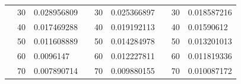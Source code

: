 \begin{table}[h]
\begin{tabular}{|cclcclccl|}
\multicolumn{1}{|c|}{\cellcolor[HTML]{FFFFC7}}                                & \multicolumn{1}{c|}{\cellcolor[HTML]{DAE8FC}30}        & \multicolumn{1}{l|}{\cellcolor[HTML]{DAE8FC}0.028956809} & \multicolumn{1}{c|}{\cellcolor[HTML]{FFFFC7}}                                & \multicolumn{1}{c|}{\cellcolor[HTML]{DAE8FC}30}        & \multicolumn{1}{l|}{\cellcolor[HTML]{DAE8FC}0.025366897} & \multicolumn{1}{c|}{\cellcolor[HTML]{FFFFC7}}                                & \multicolumn{1}{c|}{\cellcolor[HTML]{DAE8FC}30}        & 0.018587216 \\ \cline{2-3} \cline{5-6} \cline{8-9} 
\rowcolor[HTML]{DDFDFF} 
\multicolumn{1}{|c|}{\cellcolor[HTML]{FFFFC7}}                                & \multicolumn{1}{c|}{\cellcolor[HTML]{DDFDFF}40}        & \multicolumn{1}{l|}{\cellcolor[HTML]{DDFDFF}0.017469288} & \multicolumn{1}{c|}{\cellcolor[HTML]{FFFFC7}}                                & \multicolumn{1}{c|}{\cellcolor[HTML]{DDFDFF}40}        & \multicolumn{1}{l|}{\cellcolor[HTML]{DDFDFF}0.019192113} & \multicolumn{1}{c|}{\cellcolor[HTML]{FFFFC7}}                                & \multicolumn{1}{c|}{\cellcolor[HTML]{DDFDFF}40}        & 0.01590612  \\ \cline{2-3} \cline{5-6} \cline{8-9} 
\rowcolor[HTML]{DAE8FC} 
\multicolumn{1}{|c|}{\cellcolor[HTML]{FFFFC7}}                                & \multicolumn{1}{c|}{\cellcolor[HTML]{DAE8FC}50}        & \multicolumn{1}{l|}{\cellcolor[HTML]{DAE8FC}0.011608889} & \multicolumn{1}{c|}{\cellcolor[HTML]{FFFFC7}}                                & \multicolumn{1}{c|}{\cellcolor[HTML]{DAE8FC}50}        & \multicolumn{1}{l|}{\cellcolor[HTML]{DAE8FC}0.014284978} & \multicolumn{1}{c|}{\cellcolor[HTML]{FFFFC7}}                                & \multicolumn{1}{c|}{\cellcolor[HTML]{DAE8FC}50}        & 0.013201013 \\ \cline{2-3} \cline{5-6} \cline{8-9} 
\rowcolor[HTML]{DDFDFF} 
\multicolumn{1}{|c|}{\cellcolor[HTML]{FFFFC7}}                                & \multicolumn{1}{c|}{\cellcolor[HTML]{DDFDFF}60}        & \multicolumn{1}{l|}{\cellcolor[HTML]{DDFDFF}0.0096147}   & \multicolumn{1}{c|}{\cellcolor[HTML]{FFFFC7}}                                & \multicolumn{1}{c|}{\cellcolor[HTML]{DDFDFF}60}        & \multicolumn{1}{l|}{\cellcolor[HTML]{DDFDFF}0.012227811} & \multicolumn{1}{c|}{\cellcolor[HTML]{FFFFC7}}                                & \multicolumn{1}{c|}{\cellcolor[HTML]{DDFDFF}60}        & 0.011819336 \\ \cline{2-3} \cline{5-6} \cline{8-9} 
\rowcolor[HTML]{DAE8FC} 
\multicolumn{1}{|c|}{\cellcolor[HTML]{FFFFC7}}                                & \multicolumn{1}{c|}{\cellcolor[HTML]{DAE8FC}70}        & \multicolumn{1}{l|}{\cellcolor[HTML]{DAE8FC}0.007890714} & \multicolumn{1}{c|}{\cellcolor[HTML]{FFFFC7}}                                & \multicolumn{1}{c|}{\cellcolor[HTML]{DAE8FC}70}        & \multicolumn{1}{l|}{\cellcolor[HTML]{DAE8FC}0.009880155} & \multicolumn{1}{c|}{\cellcolor[HTML]{FFFFC7}}                                & \multicolumn{1}{c|}{\cellcolor[HTML]{DAE8FC}70}        & 0.010087172 \\ \cline{2-3} \cline{5-6} \cline{8-9} 

\end{tabular}
\end{table}
